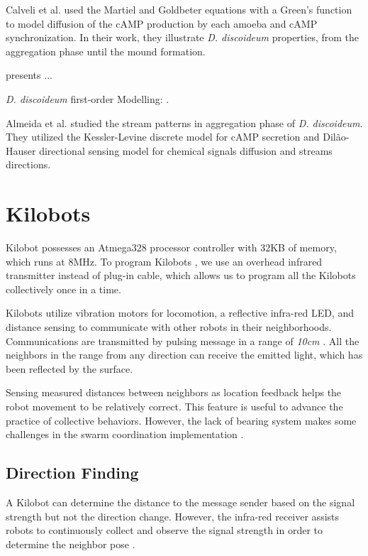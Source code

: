 \documentclass[11pt,a4paper]{article}
\begin{document}
Calveli et al. \cite{calovi2010camp} used the Martiel and Goldbeter equations \cite{martiel1987model} with a Green's function to model  diffusion of the cAMP production by each amoeba and cAMP synchronization.  In their work, they illustrate \textit{D. discoideum} properties, from the aggregation phase until the mound formation.


\cite{ValentiniEfficient2015} presents ... 

\textit{D. discoideum} first-order Modelling: \cite{palsson2000model, dallon2006mathematically, maree2000pattern}.

 Almeida et al. \cite{almeida2016directional} studied the stream patterns in aggregation phase of \textit{D. discoideum}. They utilized the Kessler-Levine discrete model \cite{kessler1993pattern} for cAMP secretion and Dilão-Hauser directional sensing model \cite{dilao2013chemotaxis} for chemical signals  diffusion and streams directions.
\section {Kilobots} 
Kilobot possesses an Atmega328 processor controller with 32KB of memory, which runs at 8MHz. To program Kilobots \cite{Nagpal2012}, we use an overhead infrared transmitter instead of plug-in cable, which allows us to program all the Kilobots collectively once in a time.

Kilobots utilize vibration motors for locomotion, a reflective infra-red LED, and distance sensing to communicate with other robots in their neighborhoods. Communications are transmitted by pulsing message in a range of \textit{10cm}  \cite{Nagpal2012}. All the neighbors in the range from any direction can receive the emitted light, which has been reflected by the surface. 

Sensing measured distances between neighbors as location feedback helps the robot movement to be relatively correct. This feature is useful to advance the practice of collective behaviors. However, the lack of bearing system makes some challenges in the swarm coordination implementation \cite{griffith2016evolutionary}. 




\subsection{Direction Finding}
A Kilobot can determine the distance to the message sender based on the signal strength but not the direction change. However, the infra-red receiver assists robots to continuously collect and observe the signal strength in order to determine the neighbor pose \cite{griffith2016evolutionary}.
\end{document}
